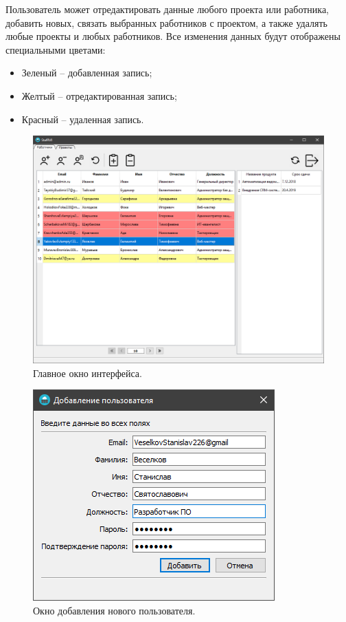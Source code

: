 \documentclass[14pt, a4paper]{extarticle}
\begin{document}
    Пользователь может отредактировать данные любого проекта или работника, добавить новых, связать выбранных работников с проектом, а также удалять любые проекты и любых работников. Все изменения данных будут отображены специальными цветами:
    \begin{itemize}
        \item Зеленый – добавленная запись;
        \item Желтый – отредактированная запись;
        \item Красный – удаленная запись.
    \end{itemize}

    \begin{figure}[h]
        \centering
        \includegraphics[width=1\linewidth]{img/main_window_win.png}
        \caption{Главное окно интерфейса.}
        \label{fig:main_window_win}
    \end{figure}

    \begin{figure}[h]
        \centering
        \includegraphics[width=0.4\linewidth]{img/add_user_window_win.png}
        \caption{Окно добавления нового пользователя.}
        \label{fig:add_user_window_win}
    \end{figure}
    
\end{document}
